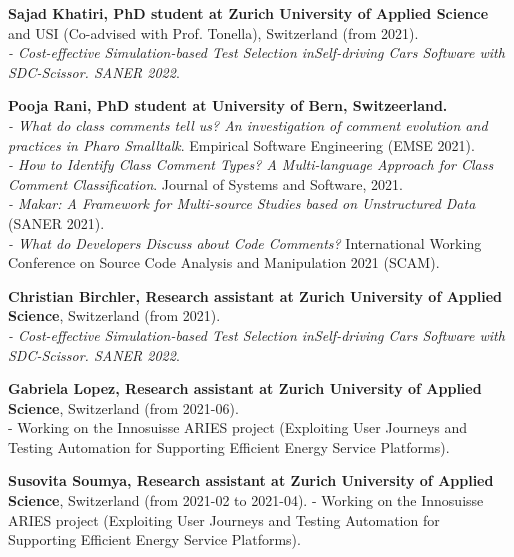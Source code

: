 \documentclass[10pt]{article}
\begin{document}
\begin{bibsection}

\item \textbf{Sajad Khatiri, PhD student at Zurich University of Applied Science} and USI (Co-advised with Prof. Tonella), Switzerland (from 2021).\\
\textit{- Cost-effective Simulation-based Test Selection inSelf-driving Cars Software with SDC-Scissor.  SANER 2022}.   

\item \textbf{Pooja Rani, PhD student at University of Bern, Switzeerland. }\\
       \textit{- What do class comments tell us? An investigation of comment evolution and practices in Pharo Smalltalk}. Empirical Software Engineering (EMSE 2021).\\
       \textit{- How to Identify Class Comment Types? A Multi-language Approach for Class Comment Classification}. Journal of Systems and Software, 2021. \\
       \textit{- Makar: A Framework for Multi-source Studies based on Unstructured Data}  (SANER 2021).\\
       \textit{- What do Developers Discuss about Code Comments?} International Working Conference on Source Code Analysis and Manipulation 2021 (SCAM).\\

\item \textbf{Christian Birchler, Research assistant at Zurich University of Applied Science}, Switzerland (from 2021). 
\\\textit{- Cost-effective Simulation-based Test Selection inSelf-driving Cars Software with SDC-Scissor.  SANER 2022}. 

\item \textbf{Gabriela Lopez, Research assistant at Zurich University of Applied Science}, Switzerland (from 2021-06). \\
- Working on the Innosuisse ARIES project (Exploiting User Journeys and Testing Automation for Supporting Efficient Energy Service Platforms).\\ 

\item \textbf{Susovita Soumya, Research assistant at Zurich University of Applied Science}, Switzerland (from 2021-02 to 2021-04). 
- Working on the Innosuisse ARIES project (Exploiting User Journeys and Testing Automation for Supporting Efficient Energy Service Platforms).\\ 


\end{bibsection}
\end{document}
